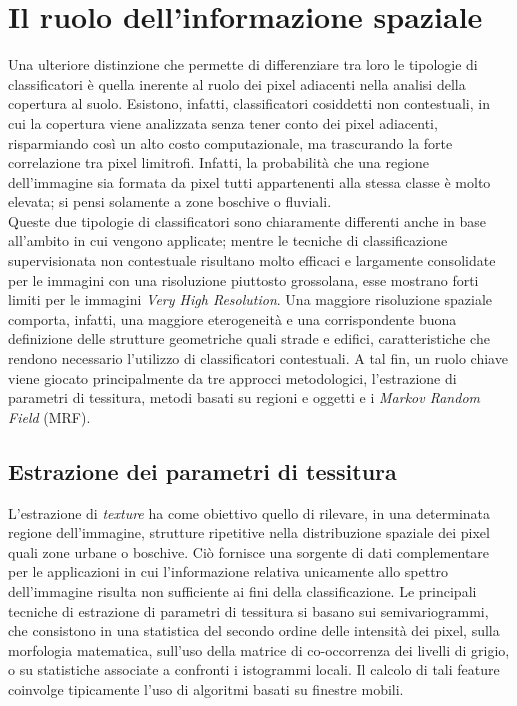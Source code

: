 \section{Il ruolo dell'informazione spaziale}

Una ulteriore distinzione che permette di differenziare tra loro le tipologie di classificatori è quella inerente al ruolo dei pixel adiacenti nella analisi della copertura al suolo. Esistono, infatti, classificatori cosiddetti non contestuali, in cui la copertura viene analizzata senza tener conto dei pixel adiacenti, risparmiando così un alto costo computazionale, ma trascurando la forte correlazione tra pixel limitrofi. Infatti, la probabilità che una regione dell'immagine sia formata da pixel tutti appartenenti alla stessa classe è molto elevata; si pensi solamente a zone boschive o fluviali. 
\\

Queste due tipologie di classificatori sono chiaramente differenti anche in base all'ambito in cui vengono applicate; mentre le tecniche di classificazione supervisionata non contestuale risultano molto efficaci e largamente consolidate per le immagini con una risoluzione piuttosto grossolana, esse mostrano forti limiti per le immagini \emph{Very High Resolution}. 
Una maggiore risoluzione spaziale comporta, infatti, una maggiore eterogeneità e una corrispondente buona definizione delle strutture geometriche quali strade e edifici, caratteristiche che rendono necessario l'utilizzo di classificatori contestuali. 
A tal fin, un ruolo chiave viene giocato principalmente da tre approcci metodologici, l'estrazione di parametri di tessitura, metodi basati su regioni e oggetti e i \emph{Markov Random Field} (MRF).


\subsection*{Estrazione dei parametri di tessitura}
L'estrazione di \emph{texture} ha come obiettivo quello di rilevare, in una determinata regione dell'immagine, strutture ripetitive nella distribuzione spaziale dei pixel quali zone urbane o boschive. 
Ciò fornisce una sorgente di dati complementare per le applicazioni in cui l'informazione relativa unicamente allo spettro dell'immagine risulta non sufficiente ai fini della classificazione. 
Le principali tecniche di estrazione di parametri di tessitura si basano sui semivariogrammi, che consistono in una statistica del secondo ordine delle intensità dei pixel, sulla morfologia matematica, sull'uso della matrice di co-occorrenza dei livelli di grigio, o su statistiche associate a confronti i istogrammi locali. Il calcolo di tali feature coinvolge tipicamente l'uso di algoritmi basati su finestre mobili.


